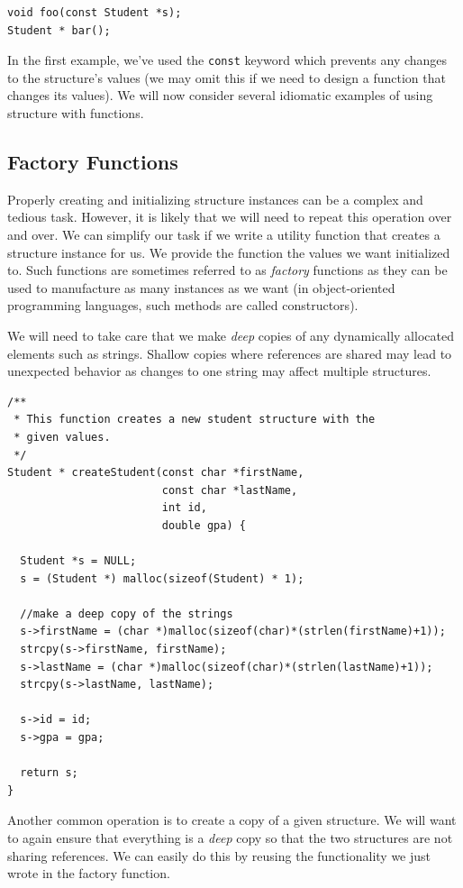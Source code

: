 \begin{verbatim}
void foo(const Student *s);
Student * bar();
\end{verbatim}

In the first example, we've used the \texttt{const} keyword which
prevents any changes to the structure's values (we may omit this if
we need to design a function that changes its values).  We will now
consider several idiomatic examples of using structure with functions.

\subsection{Factory Functions}

Properly creating and initializing structure instances can be a
complex and tedious task.  However, it is likely that we will need
to repeat this operation over and over.  We can simplify our task
if we write a utility function that creates a structure instance for us.
We provide the function the values we want initialized to.  
Such functions are sometimes referred to as \emph{factory} functions
as they can be used to manufacture as many instances as we want
(in object-oriented programming languages, such methods are called
constructors).

We will need to take care that we make  \emph{deep} copies of 
any dynamically allocated elements such as strings.  Shallow
copies  where references are shared may lead to unexpected 
behavior as changes to one string may affect multiple structures.

\begin{verbatim}
/**
 * This function creates a new student structure with the
 * given values.
 */
Student * createStudent(const char *firstName, 
                        const char *lastName, 
                        int id, 
                        double gpa) {

  Student *s = NULL;
  s = (Student *) malloc(sizeof(Student) * 1);

  //make a deep copy of the strings
  s->firstName = (char *)malloc(sizeof(char)*(strlen(firstName)+1));
  strcpy(s->firstName, firstName);
  s->lastName = (char *)malloc(sizeof(char)*(strlen(lastName)+1));
  strcpy(s->lastName, lastName);

  s->id = id;
  s->gpa = gpa;

  return s;
}
\end{verbatim}

Another common operation is to create a copy of a given structure.
We will want to again ensure that everything is a \emph{deep}
copy so that the two structures are not sharing references.  We
can easily do this by reusing the functionality we just wrote in
the factory function.


